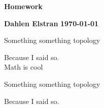 \documentclass[12pt]{article}
\begin{document}
\begin{newtitle}
  \begin{center}
    \textbf{\Huge Homework}
  \end{center}
  \textbf{Dahlen Elstran} \hfill \textbf{\today}
\end{newtitle}

\begin{statement}{1}
  Something something topology
\end{statement}
\begin{newproof}
  Because I said so. \\
  Math is cool
\end{newproof}

\begin{statement}{2}
  Something something topology
\end{statement}
\begin{newproof}
  Because I said so.
\end{newproof}
\end{document}
